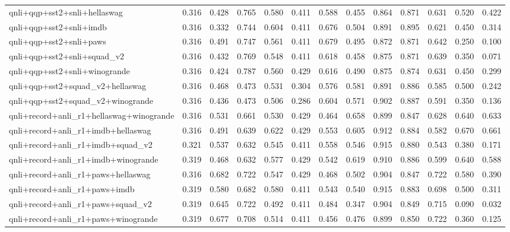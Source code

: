\begin{table}[t]
\begin{tabular}{lrrrrrrrrrrrr}
    qnli+qqp+sst2+snli+hellaswag & 0.316 & 0.428 & 0.765 & 0.580 & 0.411 & 0.588 & 0.455 & 0.864 & 0.871 & 0.631 & 0.520 & 0.422 \\
    qnli+qqp+sst2+snli+imdb & 0.316 & 0.332 & 0.744 & 0.604 & 0.411 & 0.676 & 0.504 & 0.891 & 0.895 & 0.621 & 0.450 & 0.314 \\
    qnli+qqp+sst2+snli+paws & 0.316 & 0.491 & 0.747 & 0.561 & 0.411 & 0.679 & 0.495 & 0.872 & 0.871 & 0.642 & 0.250 & 0.100 \\
    qnli+qqp+sst2+snli+squad\_v2 & 0.316 & 0.432 & 0.769 & 0.548 & 0.411 & 0.618 & 0.458 & 0.875 & 0.871 & 0.639 & 0.350 & 0.071 \\
    qnli+qqp+sst2+snli+winogrande & 0.316 & 0.424 & 0.787 & 0.560 & 0.429 & 0.616 & 0.490 & 0.875 & 0.874 & 0.631 & 0.450 & 0.299 \\
    qnli+qqp+sst2+squad\_v2+hellaswag & 0.316 & 0.468 & 0.473 & 0.531 & 0.304 & 0.576 & 0.581 & 0.891 & 0.886 & 0.585 & 0.500 & 0.242 \\
    qnli+qqp+sst2+squad\_v2+winogrande & 0.316 & 0.436 & 0.473 & 0.506 & 0.286 & 0.604 & 0.571 & 0.902 & 0.887 & 0.591 & 0.350 & 0.136 \\
    qnli+record+anli\_r1+hellaswag+winogrande & 0.316 & 0.531 & 0.661 & 0.530 & 0.429 & 0.464 & 0.658 & 0.899 & 0.847 & 0.628 & 0.640 & 0.633 \\
    qnli+record+anli\_r1+imdb+hellaswag & 0.316 & 0.491 & 0.639 & 0.622 & 0.429 & 0.553 & 0.605 & 0.912 & 0.884 & 0.582 & 0.670 & 0.661 \\
    qnli+record+anli\_r1+imdb+squad\_v2 & 0.321 & 0.537 & 0.632 & 0.545 & 0.411 & 0.558 & 0.546 & 0.915 & 0.880 & 0.543 & 0.380 & 0.171 \\
    qnli+record+anli\_r1+imdb+winogrande & 0.319 & 0.468 & 0.632 & 0.577 & 0.429 & 0.542 & 0.619 & 0.910 & 0.886 & 0.599 & 0.640 & 0.588 \\
    qnli+record+anli\_r1+paws+hellaswag & 0.316 & 0.682 & 0.722 & 0.547 & 0.429 & 0.468 & 0.502 & 0.904 & 0.847 & 0.722 & 0.580 & 0.390 \\
    qnli+record+anli\_r1+paws+imdb & 0.319 & 0.580 & 0.682 & 0.580 & 0.411 & 0.543 & 0.540 & 0.915 & 0.883 & 0.698 & 0.500 & 0.311 \\
    qnli+record+anli\_r1+paws+squad\_v2 & 0.319 & 0.645 & 0.722 & 0.492 & 0.411 & 0.484 & 0.347 & 0.904 & 0.849 & 0.715 & 0.090 & 0.032 \\
    qnli+record+anli\_r1+paws+winogrande & 0.319 & 0.677 & 0.708 & 0.514 & 0.411 & 0.456 & 0.476 & 0.899 & 0.850 & 0.722 & 0.360 & 0.125 \\

\end{tabular}
\end{table}
